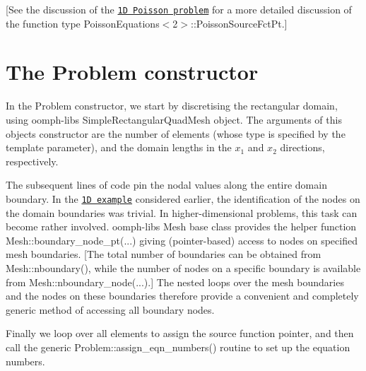 \mbox{[}See the discussion of the \href{../../../poisson/one_d_poisson/html/index.html}{\tt 1D Poisson problem} for a more detailed discussion of the function type Poisson\+Equations$<$2$>$\+::\+Poisson\+Source\+Fct\+Pt.\mbox{]}



 

\hypertarget{index_constructor}{}\section{The Problem constructor}\label{index_constructor}
In the {\ttfamily Problem} constructor, we start by discretising the rectangular domain, using {\ttfamily oomph-\/lib\textquotesingle{}s} {\ttfamily Simple\+Rectangular\+Quad\+Mesh} object. The arguments of this object\textquotesingle{}s constructor are the number of elements (whose type is specified by the template parameter), and the domain lengths in the $x_1 $ and $x_2 $ directions, respectively.

The subsequent lines of code pin the nodal values along the entire domain boundary. In the \href{../../../poisson/one_d_poisson/html/index.html}{\tt 1D example} considered earlier, the identification of the nodes on the domain boundaries was trivial. In higher-\/dimensional problems, this task can become rather involved. {\ttfamily oomph-\/lib\textquotesingle{}s} {\ttfamily Mesh} base class provides the helper function {\ttfamily Mesh\+::boundary\+\_\+node\+\_\+pt}(...) giving (pointer-\/based) access to nodes on specified mesh boundaries. \mbox{[}The total number of boundaries can be obtained from {\ttfamily Mesh\+::nboundary()}, while the number of nodes on a specific boundary is available from {\ttfamily Mesh\+::nboundary\+\_\+node}(...).\mbox{]} The nested loops over the mesh boundaries and the nodes on these boundaries therefore provide a convenient and completely generic method of accessing all boundary nodes.

Finally we loop over all elements to assign the source function pointer, and then call the generic {\ttfamily Problem\+::assign\+\_\+eqn\+\_\+numbers()} routine to set up the equation numbers.


